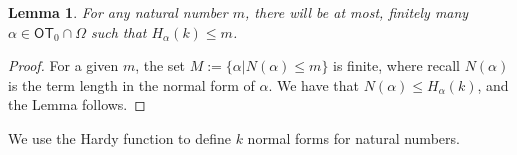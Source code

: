 \documentclass{amsart}
\theoremstyle{plain}
\theoremstyle{plain}
\newtheorem{lemma}[theorem]{Lemma}
\newcommand\OT{\mathsf{OT}}
\newcommand{\Om}{{\Omega}}
\newcommand{\al}{{\alpha}}
\begin{document}

\begin{lemma}
For any natural number $m$, there will be at most, finitely many $\al \in \OT_0\cap \Om$ such that $H_\al(k)\leq m$.
\end{lemma}
\begin{proof}
For a given $m$, the set $M := \{ \al | N(\al)\leq m \}$ is finite, where recall $N(\al)$ is the term length in the normal form of $\al$. 
We have that $N(\al)\leq H_\al(k)$, and the Lemma follows.



\end{proof}

We use the Hardy function to define $k$ normal forms for natural numbers.\medskip
\end{document}
